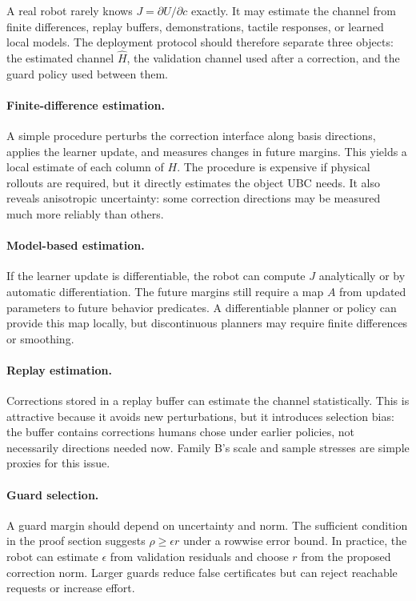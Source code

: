 \documentclass{article}
\begin{document}
A real robot rarely knows $J=\partial U/\partial c$ exactly. It may estimate the
channel from finite differences, replay buffers, demonstrations, tactile
responses, or learned local models. The deployment protocol should therefore
separate three objects: the estimated channel $\hat H$, the validation channel
used after a correction, and the guard policy used between them.

\paragraph{Finite-difference estimation.}
A simple procedure perturbs the correction interface along basis directions,
applies the learner update, and measures changes in future margins. This yields
a local estimate of each column of $H$. The procedure is expensive if physical
rollouts are required, but it directly estimates the object UBC needs. It also
reveals anisotropic uncertainty: some correction directions may be measured much
more reliably than others.

\paragraph{Model-based estimation.}
If the learner update is differentiable, the robot can compute $J$ analytically
or by automatic differentiation. The future margins still require a map $A$ from
updated parameters to future behavior predicates. A differentiable planner or
policy can provide this map locally, but discontinuous planners may require
finite differences or smoothing.

\paragraph{Replay estimation.}
Corrections stored in a replay buffer can estimate the channel statistically.
This is attractive because it avoids new perturbations, but it introduces
selection bias: the buffer contains corrections humans chose under earlier
policies, not necessarily directions needed now. Family B's scale and sample
stresses are simple proxies for this issue.

\paragraph{Guard selection.}
A guard margin should depend on uncertainty and norm. The sufficient condition
in the proof section suggests $\rho\ge \epsilon r$ under a rowwise error bound.
In practice, the robot can estimate $\epsilon$ from validation residuals and
choose $r$ from the proposed correction norm. Larger guards reduce false
certificates but can reject reachable requests or increase effort.
\end{document}
